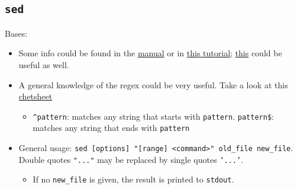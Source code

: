 \documentclass[a4paper,12pt,%
              final%
              ]{article}
\begin{document}
\subsection{\texttt{sed}}
Bases:
\begin{itemize}
  \item Some info could be found in the \href{https://www.gnu.org/software/sed/manual/sed.html}{manual} or in \href{http://www.grymoire.com/Unix/Sed.html}{this tutorial}; \href{https://www.tutorialspoint.com/unix/unix-regular-expressions.htm}{this} could be useful as well.
  \item A general knowledge of the regex could be very useful. Take a look at this \href{https://medium.com/factory-mind/regex-tutorial-a-simple-cheatsheet-by-examples-649dc1c3f285}{chetsheet}
    \begin{itemize}
      \item \verb|^pattern|: matches any string that starts with \texttt{pattern}. \verb|pattern$|: matches any string that ends with \texttt{pattern}
    \end{itemize}
  \item General usage: \verb|sed [options] "[range] <command>" old_file new_file|. Double quotes \texttt{"..."} may be replaced by single quotes \texttt{'...'}.
    \begin{itemize}
      \item If no \verb|new_file| is given, the result is printed to \texttt{stdout}.
    \end{itemize}
\end{itemize}
\end{document}
